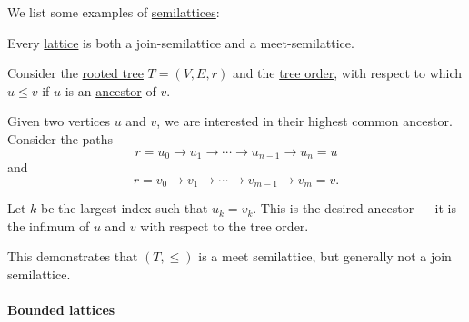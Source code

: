 \begin{example}\label{ex:def:semilattice}
  We list some examples of \hyperref[def:semilattice]{semilattices}:
  \begin{thmenum}
     Every \hyperref[def:lattice]{lattice} is both a join-semilattice and a meet-semilattice.

     Consider the \hyperref[def:rooted_tree]{rooted tree} \( T = (V, E, r) \) and the \hyperref[def:rooted_tree/order]{tree order}, with respect to which \( u \leq v \) if \( u \) is an \hyperref[def:rooted_tree/ancestor_descendant]{ancestor} of \( v \).

    Given two vertices \( u \) and \( v \), we are interested in their highest common ancestor. Consider the paths
    \begin{equation*}
      r = u_0 \to u_1 \to \cdots \to u_{n-1} \to u_n = u
    \end{equation*}
    and
    \begin{equation*}
      r = v_0 \to v_1 \to \cdots \to v_{m-1} \to v_m = v.
    \end{equation*}

    Let \( k \) be the largest index such that \( u_k = v_k \). This is the desired ancestor --- it is the infimum of \( u \) and \( v \) with respect to the tree order.

    This demonstrates that \( (T, \leq) \) is a meet semilattice, but generally not a join semilattice.
  \end{thmenum}
\end{example}

\paragraph{Bounded lattices}

